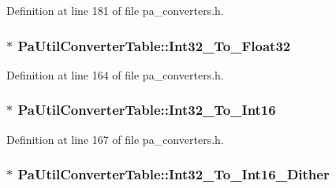 Definition at line 181 of file pa\+\_\+converters.\+h.

\subsubsection[{\texorpdfstring{Int32\+\_\+\+To\+\_\+\+Float32}{Int32_To_Float32}}]{$\ast$ Pa\+Util\+Converter\+Table\+::\+Int32\+\_\+\+To\+\_\+\+Float32}\hypertarget{struct_pa_util_converter_table_a8972c97142ce75cf251a9e76e687e312}{}\label{struct_pa_util_converter_table_a8972c97142ce75cf251a9e76e687e312}


Definition at line 164 of file pa\+\_\+converters.\+h.

\subsubsection[{\texorpdfstring{Int32\+\_\+\+To\+\_\+\+Int16}{Int32_To_Int16}}]{$\ast$ Pa\+Util\+Converter\+Table\+::\+Int32\+\_\+\+To\+\_\+\+Int16}\hypertarget{struct_pa_util_converter_table_ab3d7c1e04c7bc6d750b0ade5c60635ce}{}\label{struct_pa_util_converter_table_ab3d7c1e04c7bc6d750b0ade5c60635ce}


Definition at line 167 of file pa\+\_\+converters.\+h.

\subsubsection[{\texorpdfstring{Int32\+\_\+\+To\+\_\+\+Int16\+\_\+\+Dither}{Int32_To_Int16_Dither}}]{$\ast$ Pa\+Util\+Converter\+Table\+::\+Int32\+\_\+\+To\+\_\+\+Int16\+\_\+\+Dither}\hypertarget{struct_pa_util_converter_table_a2d7fd46de928fa784d3b74b718c265a8}{}\label{struct_pa_util_converter_table_a2d7fd46de928fa784d3b74b718c265a8}


